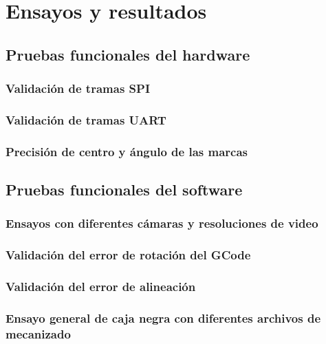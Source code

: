 \chapter{Ensayos y resultados} %
\label{Chapter4}

\section{Pruebas funcionales del hardware}
\label{sec:pruebasHW}

\subsection{Validación de tramas SPI}
\subsection{Validación de tramas UART}
\subsection{Precisión de centro y ángulo de las marcas}

\section{Pruebas funcionales del software}
\subsection{Ensayos con diferentes cámaras y resoluciones de video}
\subsection{Validación del error de rotación del GCode}
\subsection{Validación del error de alineación}
\subsection{Ensayo general de caja negra con diferentes archivos de mecanizado}

